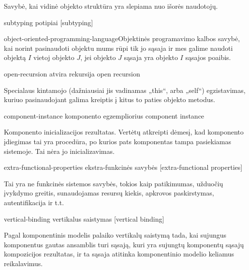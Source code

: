 \begin{glossary}
\begin{entry}
    Savybė, kai vidinė objekto struktūra yra slepiama nuo išorės
    naudotojų. \cite[225]{types-and-programming-languages}
    
  \end{entry}

  \begin{entry}%
    {subtyping}%
    {potipiai}%
    [subtyping]

    \gls{object-oriented-programming-language}{Objektinės programavimo
    kalbos} savybė, kai norint pasinaudoti objektu mums rūpi tik
    jo sąsaja ir mes galime naudoti objektą $I$ vietoj
    objekto $J$, jei objekto $J$ sąsaja yra objekto $I$ sąsajos poaibis.
    \cite[226]{types-and-programming-languages}
    
  \end{entry}

  \begin{entry}%
    {open-recursion}%
    {atvira rekursija}%
    {open recursion}

    Specialaus kintamojo (dažniausiai jis vadinamas „this“, arba
    „self“) egzistavimas, kuriuo pasinaudojant galima kreiptis į
    kitus to paties objekto metodus.
    \cite[226]{types-and-programming-languages}
    
  \end{entry}

  \begin{entry}%
    {component-instance}%
    {komponento egzempliorius}%
    {component instance}

    Komponento inicializacijos rezultatas. Vertėtų atkreipti dėmesį,
    kad komponento įdiegimas tai yra procedūra, po kurios pats
    komponentas tampa pasiekiamas sistemoje. Tai nėra jo inicializavimas.
    
  \end{entry}

  \begin{entry}%
    {extra-functional-properties}%
    {ekstra-funkcinės savybės}%
    [extra-functional properties]

    Tai yra ne funkcinės sistemos savybės, tokios kaip patikimumas,
    užduočių įvykdymo greitis, sunaudojamas resursų kiekis,
    apkrovos paskirstymas, autentifikacija ir t.t.
  
  \end{entry}

  \begin{entry}%
    {vertical-binding}%
    {vertikalus saistymas}%
    [vertical binding]

    Pagal \cite[598]{classification-framework-for-scm} komponentinis
    modelis palaiko vertikalų saistymą tada, kai sujungus komponentus
    gautas ansamblis turi sąsają, kuri yra sujungtų komponentų sąsajų
    kompozicijos rezultatas, ir ta sąsaja atitinka komponentinio
    modelio keliamus reikalavimus.
  

\end{entry}
\end{glossary}
